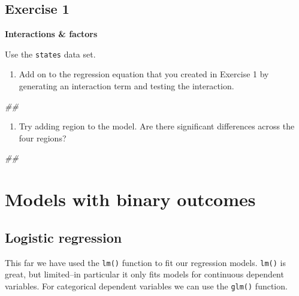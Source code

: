 \documentclass[]{book}
\newenvironment{Shaded}{\begin{snugshade}}{\end{snugshade}}
\newcommand{\CommentTok}[1]{\textcolor[rgb]{0.56,0.35,0.01}{\textit{#1}}}
\providecommand{\tightlist}{%
  \setlength{\itemsep}{0pt}\setlength{\parskip}{0pt}}
\begin{document}
\hypertarget{exercise-1-1}{%
\subsection{Exercise 1}\label{exercise-1-1}}

\textbf{Interactions \& factors}

Use the \texttt{states} data set.

\begin{enumerate}
\def\labelenumi{\arabic{enumi}.}
\tightlist
\item
  Add on to the regression equation that you created in Exercise 1 by generating an interaction term and testing the interaction.
\end{enumerate}

\begin{Shaded}
\begin{Highlighting}[]
\CommentTok{## }
\end{Highlighting}
\end{Shaded}

\begin{enumerate}
\def\labelenumi{\arabic{enumi}.}
\setcounter{enumi}{1}
\tightlist
\item
  Try adding region to the model. Are there significant differences across the four regions?
\end{enumerate}

\begin{Shaded}
\begin{Highlighting}[]
\CommentTok{## }
\end{Highlighting}
\end{Shaded}

\hypertarget{models-with-binary-outcomes}{%
\section{Models with binary outcomes}\label{models-with-binary-outcomes}}

\hypertarget{logistic-regression}{%
\subsection{Logistic regression}\label{logistic-regression}}

This far we have used the \texttt{lm()} function to fit our regression models. \texttt{lm()} is great, but limited--in particular it only fits models for continuous dependent variables. For categorical dependent variables we can use the \texttt{glm()} function.
\end{document}
